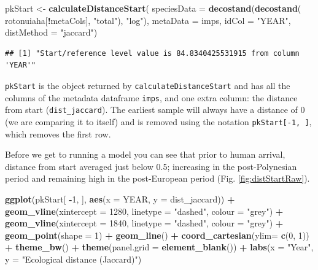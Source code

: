 \documentclass[nofonts,]{tufte-handout}
\newenvironment{Shaded}{\begin{snugshade}}{\end{snugshade}}
\newcommand{\AttributeTok}[1]{\textcolor[rgb]{0.13,0.29,0.53}{#1}}
\newcommand{\DecValTok}[1]{\textcolor[rgb]{0.00,0.00,0.81}{#1}}
\newcommand{\FunctionTok}[1]{\textcolor[rgb]{0.13,0.29,0.53}{\textbf{#1}}}
\newcommand{\NormalTok}[1]{#1}
\newcommand{\OtherTok}[1]{\textcolor[rgb]{0.56,0.35,0.01}{#1}}
\newcommand{\SpecialCharTok}[1]{\textcolor[rgb]{0.81,0.36,0.00}{\textbf{#1}}}
\newcommand{\StringTok}[1]{\textcolor[rgb]{0.31,0.60,0.02}{#1}}
\begin{document}
\begin{Shaded}
\begin{Highlighting}[]
\NormalTok{pkStart }\OtherTok{\textless{}{-}} \FunctionTok{calculateDistanceStart}\NormalTok{(}
  \AttributeTok{speciesData =} \FunctionTok{decostand}\NormalTok{(}\FunctionTok{decostand}\NormalTok{(}
\NormalTok{    rotonuiaha[}\SpecialCharTok{!}\NormalTok{metaCols], }
    \StringTok{"total"}\NormalTok{), }\StringTok{"log"}\NormalTok{), }
  \AttributeTok{metaData =}\NormalTok{ imps,}
  \AttributeTok{idCol =} \StringTok{"YEAR"}\NormalTok{,}
  \AttributeTok{distMethod =} \StringTok{"jaccard"}\NormalTok{)}
\end{Highlighting}
\end{Shaded}

\begin{verbatim}
## [1] "Start/reference level value is 84.8340425531915 from column 'YEAR'"
\end{verbatim}

\texttt{pkStart} is the object returned by
\texttt{calculateDistanceStart} and has all the columns of the metadata
dataframe \texttt{imps}, and one extra column: the distance from start
(\texttt{dist\_jaccard}). The earliest sample will always have a
distance of 0 (we are comparing it to itself) and is removed using the
notation \texttt{pkStart{[}-1,\ {]}}, which removes the first row.

Before we get to running a model you can see that prior to human
arrival, distance from start averaged just below 0.5; increasing in the
post-Polynesian period and remaining high in the post-European period
(Fig. \ref{fig:distStartRaw}).

\begin{Shaded}
\begin{Highlighting}[]
\FunctionTok{ggplot}\NormalTok{(pkStart[ }\SpecialCharTok{{-}}\DecValTok{1}\NormalTok{, ], }\FunctionTok{aes}\NormalTok{(}\AttributeTok{x =}\NormalTok{ YEAR, }\AttributeTok{y =}\NormalTok{ dist\_jaccard)) }\SpecialCharTok{+}
  \FunctionTok{geom\_vline}\NormalTok{(}\AttributeTok{xintercept =} \DecValTok{1280}\NormalTok{, }\AttributeTok{linetype =} \StringTok{"dashed"}\NormalTok{,}
             \AttributeTok{colour =} \StringTok{"grey"}\NormalTok{) }\SpecialCharTok{+}
  \FunctionTok{geom\_vline}\NormalTok{(}\AttributeTok{xintercept =} \DecValTok{1840}\NormalTok{, }\AttributeTok{linetype =} \StringTok{"dashed"}\NormalTok{,}
             \AttributeTok{colour =} \StringTok{"grey"}\NormalTok{) }\SpecialCharTok{+}
  \FunctionTok{geom\_point}\NormalTok{(}\AttributeTok{shape =} \DecValTok{1}\NormalTok{) }\SpecialCharTok{+}
  \FunctionTok{geom\_line}\NormalTok{() }\SpecialCharTok{+} 
  \FunctionTok{coord\_cartesian}\NormalTok{(}\AttributeTok{ylim=} \FunctionTok{c}\NormalTok{(}\DecValTok{0}\NormalTok{, }\DecValTok{1}\NormalTok{)) }\SpecialCharTok{+}
  \FunctionTok{theme\_bw}\NormalTok{() }\SpecialCharTok{+}
  \FunctionTok{theme}\NormalTok{(}\AttributeTok{panel.grid =} \FunctionTok{element\_blank}\NormalTok{()) }\SpecialCharTok{+}
  \FunctionTok{labs}\NormalTok{(}\AttributeTok{x =} \StringTok{"Year"}\NormalTok{, }\AttributeTok{y =} \StringTok{"Ecological distance (Jaccard)"}\NormalTok{) }
\end{Highlighting}
\end{Shaded}
\end{document}
